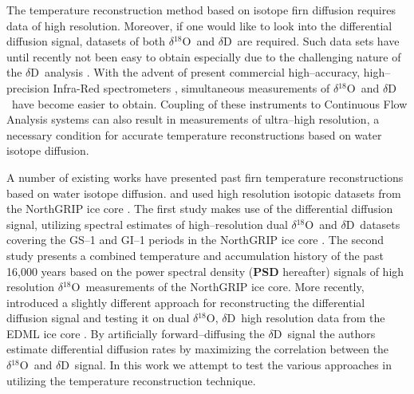 \documentclass[11pt, draftcls, onecolumn]{IEEEtran} %
\numberwithin{equation}{section}
\numberwithin{table}{section}
\numberwithin{figure}{section}
\newcommand{\delOx}{$\delta{}^{18}\mathrm{O}$}
\newcommand{\delD}{$\delta\mathrm{D}$}
\begin{document}
The temperature reconstruction method based on isotope firn diffusion requires 
data of high resolution. Moreover, if one would like to look into the differential diffusion signal, 
datasets of both \delOx~and \delD~are required. Such data sets have until recently not been easy to
obtain especially due to the challenging nature of the \delD~analysis \citep{BIGELEISEN1952, Vaughn1998}.
With the advent of present 	commercial high--accuracy, high--precision Infra-Red spectrometers 
\citep{Crosson2008, Brand2009}, simultaneous measurements of \delOx~and \delD~have become 
easier to obtain. Coupling of these instruments to Continuous Flow Analysis systems \citep{Gkinis2011, Emanuelsson2015,Jones2017a} 
can also result in measurements of ultra--high resolution, a necessary condition for 
accurate temperature reconstructions based on water isotope diffusion.

A number of existing works have presented past firn temperature reconstructions
based on water isotope diffusion. \cite{Simonsen2011} and \cite{Gkinis2014} used high resolution 
isotopic datasets from the NorthGRIP ice core \citep{NGRIPmembers2004}. The first study makes use
of the differential diffusion signal, utilizing spectral estimates of high--resolution 
dual  \delOx~and \delD~datasets covering
the GS--1 and GI--1 periods in the NorthGRIP ice core \citep{Rasmussen2014}. 
The second study 
presents a combined temperature and accumulation history of the past 16,000 years based on the 
power spectral density (\textbf{PSD} hereafter) signals of 
high resolution \delOx~measurements of the NorthGRIP ice core. More recently, \cite{vanderWel2015a}
introduced a slightly different approach for reconstructing the differential diffusion signal and testing it
on dual \delOx, \delD~high resolution data from the EDML ice core \citep{Oerter2004}. 
By artificially forward--diffusing the \delD~signal the authors estimate differential diffusion rates
by maximizing the correlation between the \delOx~and \delD~signal.  
In this work we attempt to test the various approaches in utilizing the temperature
reconstruction technique. 
\end{document}
